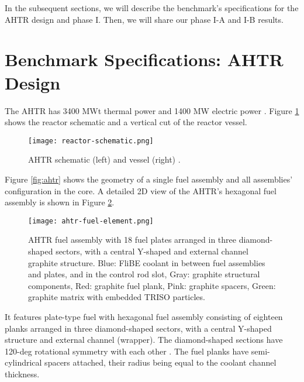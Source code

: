 In the subsequent sections, we will describe the benchmark's specifications for 
the \gls{AHTR} design and phase I. Then, we will share our phase I-A and I-B 
results. 

\section{Benchmark Specifications: AHTR Design}
The \gls{AHTR} has 3400 MWt thermal power and 1400 MW electric power 
\cite{varma_ahtr_2012}. 
Figure \ref{fig:reactor-schematic} shows the reactor schematic and a vertical 
cut of the reactor vessel. 
\begin{figure}[]
    \centering
    \texttt{[image: reactor-schematic.png]} 
    \caption{\acrlong{AHTR} schematic (left) and vessel (right) 
    \cite{noauthor_fluoride_nodate}.}
    \label{fig:reactor-schematic}
\end{figure}
Figure \ref{fig:ahtr} shows the geometry of a single fuel assembly and all 
assemblies' configuration in the core.
A detailed 2D view of the \gls{AHTR}'s hexagonal fuel assembly is shown in 
Figure \ref{fig:ahtr-fuel-assembly}.  
\begin{figure}[]
    \centering
    \texttt{[image: ahtr-fuel-element.png]} 
    \caption{\acrlong{AHTR} fuel assembly with 18 fuel plates arranged in 
    three diamond-shaped sectors, with a central Y-shaped and external channel 
    graphite structure. Blue: FliBE coolant in between fuel assemblies and plates, 
    and in the control rod slot, Gray: graphite structural components, 
    Red: graphite fuel plank, Pink: graphite spacers, Green: graphite matrix 
    with embedded TRISO particles.}
    \label{fig:ahtr-fuel-assembly}
\end{figure}
It features plate-type fuel with hexagonal fuel assembly consisting of eighteen 
planks arranged in three diamond-shaped sectors, with a central Y-shaped 
structure and external channel (wrapper).
The diamond-shaped sections have 120-deg rotational symmetry with each other 
\cite{varma_ahtr_2012,ramey_monte_2018,noauthor_fluoride_nodate}. 
The fuel planks have semi-cylindrical spacers attached, their radius being 
equal to the coolant channel thickness. 

